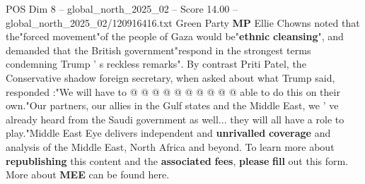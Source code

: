 \begin{textsample}{POS Dim 8 – global\_north\_2025\_02 – Score 14.00 – global\_north\_2025\_02/120916416.txt}
Green Party \textbf{MP} Ellie Chowns noted that the"forced movement"of the people of Gaza would be"\textbf{ethnic} \textbf{cleansing}", and demanded that the British government"respond in the strongest terms condemning Trump ' s reckless remarks".
By contrast Priti Patel, the Conservative shadow foreign secretary, when asked about what Trump said, responded :"We will have to @ @ @ @ @ @ @ @ @ @ able to do this on their own."Our partners, our allies in the Gulf states and the Middle East, we ' ve already heard from the Saudi government as well... they will all have a role to play."Middle East Eye delivers independent and \textbf{unrivalled} \textbf{coverage} and analysis of the Middle East, North Africa and beyond.
To learn more about \textbf{republishing} this content and the \textbf{associated} \textbf{fees}, \textbf{please} \textbf{fill} out this form.
More about \textbf{MEE} can be found here.

\end{textsample}
